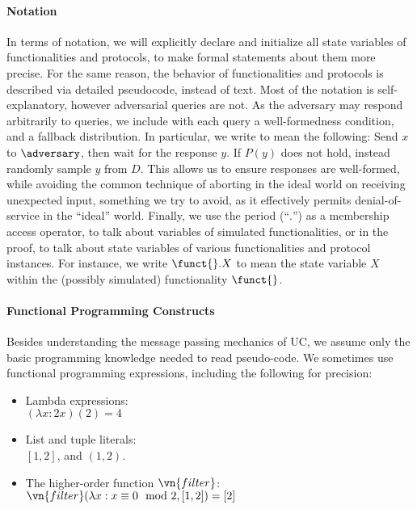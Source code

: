 \paragraph{Notation}

In terms of notation, we will explicitly declare and initialize all state
variables of functionalities and protocols, to make formal statements about them
more precise. For the same reason, the behavior of functionalities and
protocols is described via detailed pseudocode, instead of text. Most of the
notation is self-explanatory, however adversarial queries are not. As the
adversary may respond arbitrarily to queries, we include with each query a
well-formedness condition, and a fallback distribution. In particular, we write
 to mean the following: Send $x$ to $\adversary$, then
wait for the response $y$. If $P(y)$ does not hold, instead randomly sample $y$
from $D$. This allows us to ensure responses are well-formed, while avoiding the
common technique of aborting in the ideal world on receiving unexpected input,
something we try to avoid, as it effectively permits denial-of-service in the
``ideal'' world. Finally, we use the period (``$.$'') as a membership access
operator, to talk about variables of simulated functionalities, or in the proof,
to talk about state variables of various functionalities and protocol instances.
For instance, we write $\funct{}.X$ to mean the state variable $X$ within the
(possibly simulated) functionality $\funct{}$.

\paragraph{Functional Programming Constructs}

Besides understanding the message passing mechanics of UC, we assume only the
basic programming knowledge needed to read pseudo-code. We sometimes use
functional programming expressions, including the following for precision:

\begin{itemize}
  \item Lambda expressions:\\ $(\lambda x : 2x)(2) = 4$
  \item List and tuple literals:\\ $[1, 2]$, and $(1, 2)$.
  \item The higher-order function $\vn{filter}$:\\ $\vn{filter}(\lambda x: x
    \equiv 0 \mod 2, [1, 2]) = [2]$
\end{itemize}

